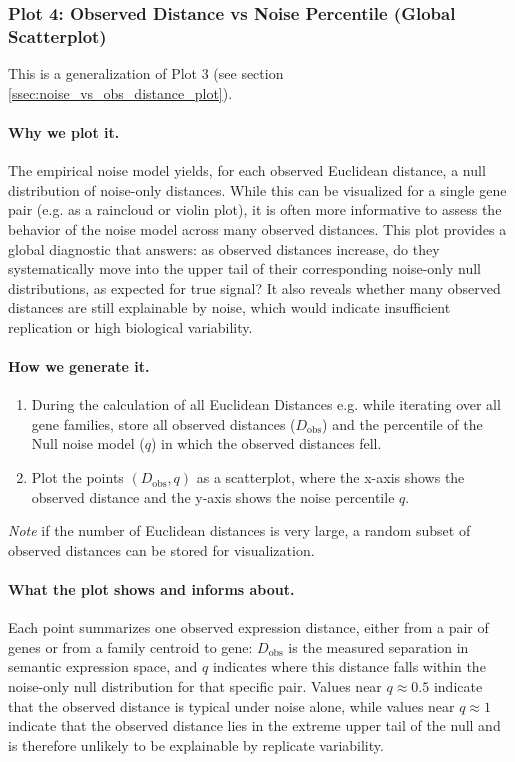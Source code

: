\documentclass{article}
\begin{document}
\subsubsection{Plot 4: Observed Distance vs Noise Percentile (Global Scatterplot)}
\label{ssec:obs_vs_noise_quant_plot}

This is a generalization of Plot 3 (see section \ref{ssec:noise_vs_obs_distance_plot}).

\paragraph{Why we plot it.}
The empirical noise model yields, for each observed Euclidean distance, a null distribution of noise-only distances. While this can be visualized for a single gene pair (e.g. as a raincloud or violin plot), it is often more informative to assess the behavior of the noise model across many observed distances. This plot provides a global diagnostic that answers: as observed distances increase, do they systematically move into the upper tail of their corresponding noise-only null distributions, as expected for true signal? It also reveals whether many observed distances are still explainable by noise, which would indicate insufficient replication or high biological variability.

\paragraph{How we generate it.}
\begin{enumerate}
\item During the calculation of all Euclidean Distances e.g. while iterating over all gene families, store all observed distances ($D_{\mathrm{obs}}$) and the percentile of the Null noise model ($q$) in which the observed distances fell.
\item Plot the points $(D_{\mathrm{obs}}, q)$ as a scatterplot, where the x-axis shows the observed distance and the y-axis shows the noise percentile $q$.
\end{enumerate}

\emph{Note} if the number of Euclidean distances is very large, a random subset of observed distances can be stored for visualization.

\paragraph{What the plot shows and informs about.}
Each point summarizes one observed expression distance, either from a pair of genes or from a family centroid to gene: $D_{\mathrm{obs}}$ is the measured separation in semantic expression space, and $q$ indicates where this distance falls within the noise-only null distribution for that specific pair. Values near $q \approx 0.5$ indicate that the observed distance is typical under noise alone, while values near $q \approx 1$ indicate that the observed distance lies in the extreme upper tail of the null and is therefore unlikely to be explainable by replicate variability.
\end{document}

